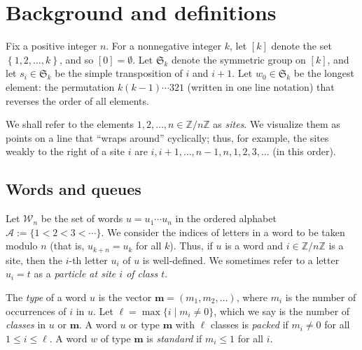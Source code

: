 \documentclass[reqno]{amsart}%
\newcommand{\0}{\phantom{c}}
\theoremstyle{plain}
\theoremstyle{definition}
\numberwithin{equation}{section}
\begin{document}


\section{Background and definitions}

\label{sec:background}

Fix a positive integer $n$. For a nonnegative integer $k$, let $\left[  k
\right]  $ denote the set $\left\{  1, 2, \ldots, k \right\}  $, and so $[0] =
\emptyset$. Let $\mathfrak{S}_{k}$ denote the symmetric group on $\left[  k
\right]  $, and let $s_{i} \in\mathfrak{S}_{k}$ be the simple transposition of
$i$ and $i+1$. Let $w_{0} \in\mathfrak{S}_{k}$ be the longest element: the
permutation $k (k-1) \dotsm321$ (written in one line notation) that reverses
the order of all elements.

We shall refer to the elements $1, 2, \ldots, n \in\mathbb{Z} / n \mathbb{Z}$
as {\color{darkred}\emph{sites}}. We visualize them as points on a line that
``wraps around'' cyclically; thus, for example, the sites weakly to the right
of a site $i$ are $i, i+1, \ldots, n-1, n, 1, 2, 3, \ldots$ (in this order).



\subsection{Words and queues}

Let $\mathcal{W}_{n}$ be the set of words $u = u_{1} \dotsm u_{n}$ in the
ordered alphabet $\mathcal{A} := \{1 < 2 < 3 < \cdots\}$. We consider the
indices of letters in a word to be taken modulo $n$ (that is, $u_{k+n} =
u_{k}$ for all $k$). Thus, if $u$ is a word and $i \in\mathbb{Z} / n
\mathbb{Z}$ is a site, then the $i$-th letter $u_{i}$ of $u$ is well-defined.
We sometimes refer to a letter $u_{i} = t$ as a {\color{darkred}\emph{particle
at site $i$ of class $t$}}.

The {\color{darkred}\emph{type}} of a word $u$ is the vector $\mathbf{m} =
(m_{1}, m_{2}, \ldots)$, where $m_{i}$ is the number of occurrences of $i$ in
$u$. Let $\ell= \max\{i \mid m_{i} \neq0 \}$, which we say is the number of
{\color{darkred}\emph{classes}} in $u$ or $\mathbf{m}$. A word $u$ or type
$\mathbf{m}$ with $\ell$ classes is {\color{darkred}\emph{packed}} if $m_{i}
\neq0$ for all $1 \leq i \leq\ell$. A word $w$ of type $\mathbf{m}$ is
{\color{darkred}\emph{standard}} if $m_{i} \leq1$ for all $i$.
\end{document}
